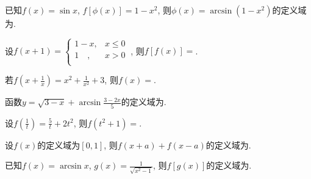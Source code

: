 \begin{problem}已知$f\left( x \right) = \sin x$, $f\left\lbrack \phi\left( x \right) \right\rbrack = 1 - x^{2}$, 则$\phi(x) = \arcsin\left( 1 - x^{2} \right)$的定义域为.
\end{problem} 

\begin{problem}设$f\left( x + 1 \right) = \left\{ \begin{matrix}
	1 - x, & x \leq 0 \\
	1\quad, & x > 0 \\
	\end{matrix} \right.\ $, 则$f\left\lbrack f\left( x \right) \right\rbrack =$.
\end{problem}

\begin{problem}若$\displaystyle f\left( x + \frac{1}{x} \right) = x^{2} + \frac{1}{x^{2}} + 3$, 则$f\left( x \right) =$.
\end{problem} 



\begin{problem}
	函数$y = \sqrt{3 - x} + \arcsin\frac{3 - 2x}{5}$的定义域为.
\end{problem} 

\begin{problem}
	设$\displaystyle f\left( \frac{1}{t} \right) = \frac{5}{t} + 2t^{2}$, 则$f\left( t^{2} + 1 \right) =$.
\end{problem}


\begin{problem}设$f\left( x \right)$的定义域为$\left\lbrack 0,1 \right\rbrack$, 则$f\left( x + a \right) + f\left( x - a \right)$的定义域为.
\end{problem}


\begin{problem}
	已知$f\left( x \right) = \arcsin x$, $\displaystyle g\left( x \right) = \frac{1}{\sqrt{x^{2} - 1}}$, 则$f\left\lbrack g\left( x \right) \right\rbrack$的定义域为.
\end{problem}


